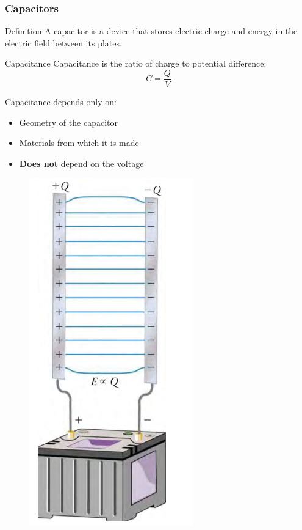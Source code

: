 \documentclass{beamer}
\begin{document}
\begin{frame}
    \frametitle{Capacitors}
    \begin{block}{Definition}
        A capacitor is a device that stores electric charge and energy in the electric field between its plates.
    \end{block}
    
    \begin{block}{Capacitance}
        Capacitance is the ratio of charge to potential difference:
        \begin{equation}
            C = \frac{Q}{V}
        \end{equation}
        
        Capacitance depends only on:
        \begin{itemize}
            \item Geometry of the capacitor
            \item Materials from which it is made
            \item \textbf{Does not} depend on the voltage
        \end{itemize}
    \end{block}
    \end{frame}

\begin{frame}
    
       \begin{figure}
           \centering
           \includegraphics[width=0.25\linewidth]{prrllplatecap.png}
       \end{figure}
    
\end{frame}
\end{document}
